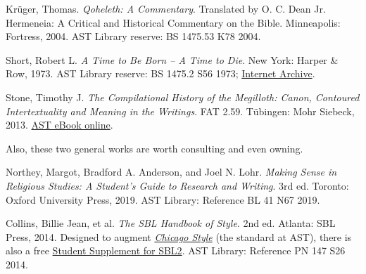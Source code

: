 \documentclass[titlepage]{article}
\begin{document}
\begin{thebibliography}{Christianson}
	 Krüger, Thomas.
	\emph{Qoheleth: A Commentary}. Translated by O. C. Dean Jr. Hermeneia: A Critical and Historical Commentary on the Bible.
	Minneapolis: Fortress, 2004. AST Library reserve: BS 1475.53 K78 2004.

	 Short, Robert L.
	\emph{A Time to Be Born -- A Time to Die}.
	New York: Harper \& Row, 1973. AST Library reserve: BS 1475.2 S56 1973; \href{https://archive.org/embed/timetobebornatim0000shor}{Internet Archive}.

	 Stone, Timothy J.
	\emph{The Compilational History of the Megilloth: Canon, Contoured Intertextuality and Meaning in the Writings}. FAT 2.59.
	Tübingen: Mohr Siebeck, 2013. \href{https://ast.primo.exlibrisgroup.com/view/action/uresolver.do?operation=resolveService&package_service_id=930405630007188&institutionId=7188&customerId=7185&VE=true}{AST eBook online}.

\end{thebibliography}
\endgroup

Also, these two general works are worth consulting and even owning.

\begingroup
\renewcommand{\section}[2]{}%
\begin{thebibliography}{RLGS}%

	 Northey, Margot, Bradford A. Anderson, and Joel N. Lohr.
	\emph{Making Sense in Religious Studies: A Student's Guide to Research and Writing}.
	3rd ed. Toronto: Oxford University Press, 2019. AST Library: Reference BL 41 N67 2019.

	 Collins, Billie Jean, et al.
	\emph{The SBL Handbook of Style}.
	2nd ed. Atlanta: SBL Press, 2014.
	Designed to augment \href{https://proxy.openathens.net/login?qurl=https%3A%2F%2Fwww.chicagomanualofstyle.org%2Fbook%2Fed17%2Ffrontmatter%2Ftoc.html}{\emph{Chicago Style}}
	(the standard at AST), there is also a free
	\href{https://www.sbl-site.org/wp-content/uploads/2025/04/SBLHSsupp2015-02.pdf}{Student Supplement for SBL2}. AST Library: Reference PN 147 S26 2014.

\end{thebibliography}
\endgroup
\end{document}

